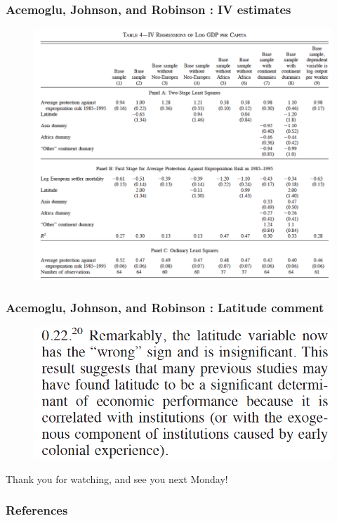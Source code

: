 \documentclass[12pt,english,dvipsnames,aspectratio=169,handout]{beamer}\usepackage[]{graphicx}\usepackage[]{xcolor}
\begin{document}
\begin{frame}
	\frametitle{Acemoglu, Johnson, and Robinson \citeyear{acemoglu_colonial_2001}: IV estimates}
	 \begin{figure} 
    \includegraphics[height=.8\textheight,keepaspectratio=true]{../04-figures/05/13-ajr_table4}
    \end{figure}
\end{frame}


\begin{frame}
	\frametitle{Acemoglu, Johnson, and Robinson \citeyear{acemoglu_colonial_2001}: Latitude comment}
	 \begin{figure} 
    \includegraphics[height=.5\textheight,keepaspectratio=true]{../04-figures/05/14-ajr_latitude}
    \end{figure}
\end{frame}


\begin{frame}
\begin{center}
    \LARGE Thank you for watching, and see you next Monday!
\end{center}
\end{frame}


\begin{frame}[allowframebreaks]
\frametitle{References}

\scriptsize
\end{frame}
\end{document}
